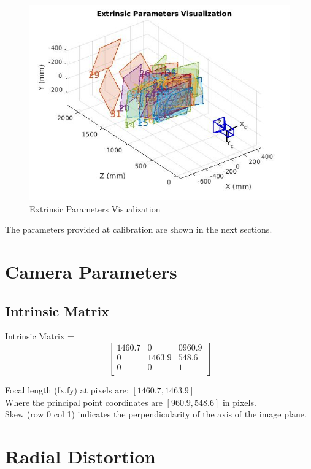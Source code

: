 \documentclass[12pt]{scrartcl}
\begin{document}
\begin{itemize}
\begin{figure}[ht!]
\includegraphics[scale=0.70]{images/extrinsic}
\caption{Extrinsic Parameters Visualization}
\label{fig:extrinsic}
\end{figure}
\end{itemize}

The parameters provided at calibration are shown in the next sections.

\section*{Camera Parameters}

\subsection*{Intrinsic Matrix}
Intrinsic Matrix = \[\left[\begin{matrix}
1460.7&0&0960.9\\
0&1463.9&548.6\\
0&0&1\\
\end{matrix}\right]
\]

Focal length (fx,fy) at pixels are: $[1460.7,1463.9]$\\
Where the principal point coordinates are $[960.9,548.6]$ in pixels.\\
Skew (row 0 col 1) indicates the perpendicularity of the axis of the image plane.\\

\section*{Radial Distortion}
\end{document}
